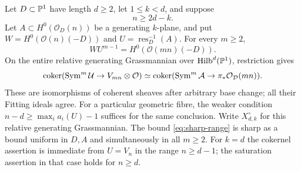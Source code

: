 \begin{theorem}\label{thm:sharp-conductor}
Let $D\subset\mathbb P^1$ have length $d\ge2$, let $1\le k<d$, and suppose
\begin{equation}\label{eq:sharp-range} n\ge2d-k.\end{equation}
Let $A\subset H^0(\mathcal O_D(n))$ be a generating $k$-plane, and put
$W=H^0(\mathcal O(n)(-D))$ and $U=\operatorname{res}_D^{-1}(A)$.
For every $m\ge2$,
\begin{equation}\label{eq:sharp-saturation}
 WU^{m-1}=H^0(\mathcal O(mn)(-D)).
\end{equation}
On the entire relative generating Grassmannian over
$\operatorname{Hilb}^d(\mathbb P^1)$, restriction gives
\begin{equation}\label{eq:sharp-cokernel}
 \operatorname{coker}(\operatorname{Sym}^m\mathcal U\to V_{mn}\otimes\mathcal O)
 \simeq
 \operatorname{coker}(\operatorname{Sym}^m\mathcal A\to\pi_*\mathcal O_{\mathcal D}(mn)).
\end{equation}
These are isomorphisms of coherent sheaves after arbitrary base change;
all their Fitting ideals agree. For a particular geometric fibre, the
weaker condition $n-d\ge\max_i a_i(U)-1$ suffices for the same conclusion.
Write $X_{d,k}^\circ$ for this relative generating Grassmannian. The bound \eqref{eq:sharp-range} is sharp as a bound uniform in $D,A$
and simultaneously in all $m\ge2$. For $k=d$ the cokernel assertion is immediate
from $U=V_n$ in the range $n\ge d-1$; the saturation assertion
in that case holds for $n\ge d$.
\end{theorem}

